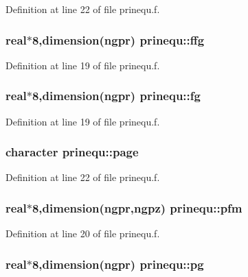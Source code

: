 Definition at line 22 of file prinequ.f.\hypertarget{namespaceprinequ_f8556fceda08dd098e7ba4d9057fd31c}{
\subsubsection[ffg]{\setlength{\rightskip}{0pt plus 5cm}real$\ast$8,dimension(ngpr) {\bf prinequ::ffg}}}
\label{namespaceprinequ_f8556fceda08dd098e7ba4d9057fd31c}




Definition at line 19 of file prinequ.f.\hypertarget{namespaceprinequ_8c941e8d1710a7e26be0b09de01cc307}{
\subsubsection[fg]{\setlength{\rightskip}{0pt plus 5cm}real$\ast$8,dimension(ngpr) {\bf prinequ::fg}}}
\label{namespaceprinequ_8c941e8d1710a7e26be0b09de01cc307}




Definition at line 19 of file prinequ.f.\hypertarget{namespaceprinequ_739dea1dcb841b3637127568990b1f19}{
\subsubsection[page]{\setlength{\rightskip}{0pt plus 5cm}character {\bf prinequ::page}}}
\label{namespaceprinequ_739dea1dcb841b3637127568990b1f19}




Definition at line 22 of file prinequ.f.\hypertarget{namespaceprinequ_bfe2ebab5c6892d669d60769f6271de2}{
\subsubsection[pfm]{\setlength{\rightskip}{0pt plus 5cm}real$\ast$8,dimension(ngpr,ngpz) {\bf prinequ::pfm}}}
\label{namespaceprinequ_bfe2ebab5c6892d669d60769f6271de2}




Definition at line 20 of file prinequ.f.\hypertarget{namespaceprinequ_27c808b12ae848c864b2ff5c5369e351}{
\subsubsection[pg]{\setlength{\rightskip}{0pt plus 5cm}real$\ast$8,dimension(ngpr) {\bf prinequ::pg}}}
\label{namespaceprinequ_27c808b12ae848c864b2ff5c5369e351}




